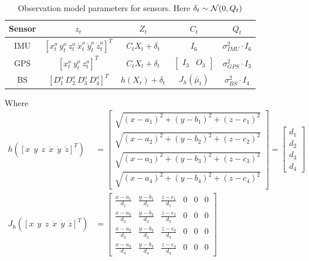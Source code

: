 \begin{table}[H]
    \centering
    \begin{tabular}{|c|c|c|c|c|}
        \hline
        Sensor & $z_t$ & $Z_t$ & $C_t$ & $Q_t$ \\
        \hline
        IMU & $[x^o_t \ y^o_t \ z^o_t \ \dot{x}_t^o \ \dot{y}_t^o \ \dot{z}_t^o]^T$ 
        & $C_t X_t + \delta_t$ & $I_6$ & $\sigma_{IMU}^2 \cdot I_6$ \\
        
        GPS & $[x^o_t \ y^o_t  \ z^o_t]^T$ 
        & $C_t X_t + \delta_t$ & $\begin{bmatrix} I_3 & O_3 \end{bmatrix}$ & $\sigma_{GPS}^2 \cdot I_3$ \\
        
        BS & $[D_1^o \ D_2^o \ D_3^o \ D_4^o]^T$  
        & $h(X_t) + \delta_t$  
        & $J_h(\bar{\mu}_t)$ 
        & $\sigma_{BS}^2 \cdot I_4$ \\      
        \hline
    \end{tabular}
    \caption{Observation model parameters for sensors. Here $\delta_t \sim \mathcal{N}(0, Q_t)$}
    \label{tab:obs_model}
\end{table}


Where 
\begin{align*}
h([x \ \ y \ \ z \ \ \dot{x} \ \ \dot{y} \ \ \dot{z} ]^T)
&=
\begin{bmatrix}
\sqrt{(x - a_1)^2 + (y - b_1)^2 + (z - c_1)^2} \\
\sqrt{(x - a_2)^2 + (y - b_2)^2 + (z - c_2)^2} \\
\sqrt{(x - a_3)^2 + (y - b_3)^2 + (z - c_3)^2} \\
\sqrt{(x - a_4)^2 + (y - b_4)^2 + (z - c_4)^2}
\end{bmatrix}
= \begin{bmatrix}
d_1 \\
d_2 \\
d_3 \\
d_4
\end{bmatrix}\\
J_h([x \ \ y \ \ z \ \ \dot{x} \ \ \dot{y} \ \ \dot{z} ]^T)  &=
\begin{bmatrix}
\frac{x - a_1}{d_1} & \frac{y - b_1}{d_1} & \frac{z - c_1}{d_1} & 0 & 0 & 0\\
\frac{x - a_2}{d_2} & \frac{y - b_2}{d_2} & \frac{z - c_2}{d_2} & 0 & 0 & 0\\
\frac{x - a_3}{d_3} & \frac{y - b_3}{d_3} & \frac{z - c_3}{d_3} & 0 & 0 & 0\\
\frac{x - a_4}{d_4} & \frac{y - b_4}{d_4} & \frac{z - c_4}{d_4} & 0 & 0 & 0
\end{bmatrix}
\end{align*}

